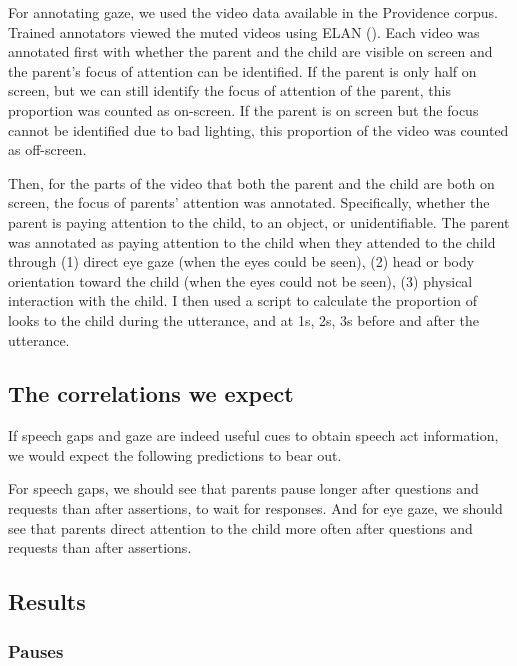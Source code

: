 For annotating gaze, we used the video data available in the Providence corpus. Trained annotators viewed the muted videos using ELAN (\cite{elan}). Each video was annotated first with whether the parent and the child are visible on screen and the parent's focus of attention can be identified. If the parent is only half on screen, but we can still identify the focus of attention of the parent, this proportion was counted as on-screen. If the parent is on screen but the focus cannot be identified due to bad lighting, this proportion of the video was counted as off-screen.

Then, for the parts of the video that both the parent and the child are both on screen, the focus of parents' attention was annotated. Specifically, whether the parent is paying attention to the child, to an object, or unidentifiable. The parent was annotated as paying attention to the child when they attended to the child through (1) direct eye gaze (when the eyes could be seen), (2) head or body orientation toward the child (when the eyes could not be seen), (3) physical interaction with the child. I then used a script to calculate the proportion of looks to the child during the utterance, and at 1s, 2s, 3s before and after the utterance.%
 
\subsection{The correlations we expect}
\label{sec:engsp:predictions}
If speech gaps and gaze are indeed useful cues to obtain speech act information, we would expect the following predictions to bear out.


For speech gaps, we should see that parents pause longer after questions and requests than after assertions, to wait for responses.
And for eye gaze, we should see that parents direct attention to the child more often after questions and requests than after assertions. 


\subsection{Results}
\label{sec:engsp:results}

\subsubsection{Pauses}
\label{sec:engsp:results:pause}

